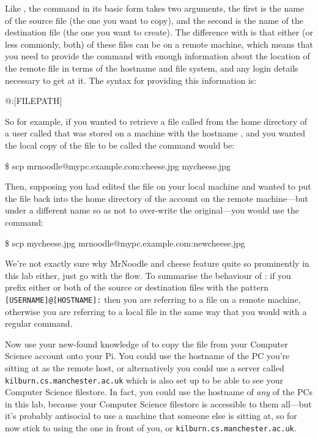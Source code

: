 Like , the  command in its basic form takes two arguments, the first is the name of the source file (the one you want to copy), and the second is the name of the destination file (the one you want to create). The difference with  is that either (or less commonly, both) of these files can be on a remote machine, which means that you need to provide the command with enough information about the location of the remote file in terms of the hostname and file system, and any login details necessary to get at it. The syntax for providing this information is:

\begin{ttoutenv}
[USERNAME]\!@\![HOSTNAME]:[FILEPATH]
\end{ttoutenv}

So for example, if you wanted to retrieve a file called  from the home directory of a user called  that was stored on a machine with the hostname , and you wanted the local copy of the file to be called  the command would be:

\begin{ttoutenv}
\$ scp mrnoodle@mypc.example.com:cheese.jpg mycheese.jpg
\end{ttoutenv}

Then, supposing you had edited the file  on your local machine and wanted to put the file back into the home directory of the  account on the remote machine---but under a different name so as not to over-write the original---you would use the command:

\begin{ttoutenv}
\$ scp mycheese.jpg mrnoodle@mypc.example.com:newcheese.jpg
\end{ttoutenv}

We're not exactly sure why MrNoodle and cheese feature quite so prominently in this lab either, just go with the flow. To summarise the behaviour of : if you prefix either or both of the source or destination files with the pattern \verb|[USERNAME]@[HOSTNAME]:| then you are referring to a file on a remote machine, otherwise you are referring to a local file in the same way that you would with a regular  command.

Now use your new-found knowledge of  to copy the  file from your Computer Science account onto your Pi. You could use the hostname of the PC you're sitting at as the remote host, or alternatively you could use a server called \texttt{kilburn.cs.manchester.ac.uk} which is also set up to be able to see your Computer Science filestore. In fact, you could use the hostname of \textit{any} of the PCs in this lab, because your Computer Science filestore is accessible to them all---but it's probably antisocial to use a machine that someone else is sitting at, so for now stick to using the one in front of you, or \texttt{kilburn.cs.manchester.ac.uk}.



